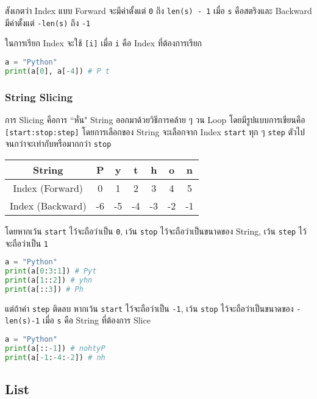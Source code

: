 สังเกตว่า Index แบบ Forward จะมีค่าตั้งแต่ \verb|0| ถึง \verb|len(s) - 1| เมื่อ \verb|s| คือสตริงและ Backward มีค่าตั้งแต่ \verb|-len(s)| ถึง \verb|-1|

ในการเรียก Index จะใช้ \verb|[i]| เมื่อ \verb|i| คือ Index ที่ต้องการเรียก

\begin{lstlisting}[language=Python]
a = "Python"
print(a[0], a[-4]) # P t
\end{lstlisting}

\subsubsection{String Slicing}

การ Slicing คือการ ``หั่น" String ออกมาด้วยวิธีการคล้าย ๆ วน Loop โดยมีรูปแบบการเขียนคือ \verb|[start:stop:step]| โดยการเลือกของ String จะเลือกจาก Index \verb|start| ทุก ๆ \verb|step| ตัวไปจนกว่าจะเท่ากับหรือมากกว่า \verb|stop|

\begin{center}
    \begin{tabular}{|c|c|c|c|c|c|c|}
         \hline
         String & P & y & t & h & o & n\\
         \hline
         Index (Forward) & 0 & 1 & 2 & 3 & 4 & 5\\
         \hline
         Index (Backward) & -6 & -5 & -4 & -3 & -2 & -1\\
         \hline
    \end{tabular}
\end{center}

โดยหากเว้น \verb|start| ไว้จะถือว่าเป็น \verb|0|, เว้น \verb|stop| ไว้จะถือว่าเป็นขนาดของ String, เว้น \verb|step| ไว้จะถือว่าเป็น \verb|1|

\begin{lstlisting}[language=Python]
a = "Python"
print(a[0:3:1]) # Pyt
print(a[1::2]) # yhn
print(a[::3]) # Ph
\end{lstlisting}

แต่ถ้าค่า \verb|step| ติดลบ หากเว้น \verb|start| ไว้จะถือว่าเป็น \verb|-1|, เว้น \verb|stop| ไว้จะถือว่าเป็นขนาดของ \verb|-len(s)-1| เมื่อ \verb|s| คือ String ที่ต้องการ Slice

\begin{lstlisting}[language=Python]
a = "Python"
print(a[::-1]) # nohtyP
print(a[-1:-4:-2]) # nh
\end{lstlisting}

\subsection{List}

